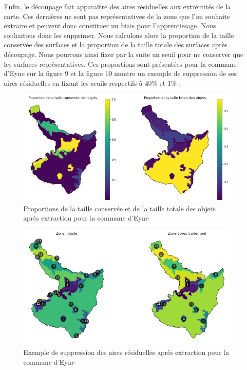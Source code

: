 Enfin, le découpage fait apparaître des aires résiduelles aux extrémités de la carte.
Ces dernières ne sont pas représentatives de la zone que l'on souhaite extraire et peuvent donc constituer un biais pour l'apprentissage.
Nous souhaitons donc les supprimer.
Nous calculons alors la proportion de la taille conservée des surfaces et la proportion de la taille totale des surfaces après découpage.
Nous pourrons ainsi fixer par la suite un seuil pour ne conserver que les surfaces représentatives.
Ces proportions sont présentées pour la commune d'Eyne sur la figure 9 et la figure 10 montre un exemple de suppression de ses aires résiduelles en fixant les seuils respectifs à $40\%$ et $1\%$ .


\begin{figure}
    \centering
    \includegraphics[scale=0.5]{figures/eyne-residus-prop}
    \caption{Proportions de la taille conservée et de la taille totale des objets après extraction pour la commune d'Eyne}
\end{figure}


\begin{figure}
    \centering
    \includegraphics[scale=0.5]{figures/eyne-sup-residus}
    \caption{Exemple de suppression des aires résiduelles après extraction pour la commune d'Eyne}
\end{figure}


